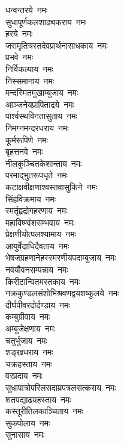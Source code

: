 \begin{multicols}{2}
\begin{flushleft}
धन्वन्तरये~नमः\\
सुधापूर्णकलशाढ्यकराय~नमः\\
हरये~नमः\\
जरामृतित्रस्तदेवप्रार्थना\-साधकाय~नमः\\
प्रभवे~नमः\\
निर्विकल्पाय~नमः\\
निस्समानाय~नमः\\
मन्दस्मितमुखाम्बुजाय~नमः\\
आञ्जनेयप्रापिताद्रये~नमः\\
पार्श्वस्थविनतासुताय~नमः\hfill{}\\
निमग्नमन्दरधराय~नमः\\
कूर्मरूपिणे~नमः\\
बृहत्तनवे~नमः\\
नीलकुञ्चितकेशान्ताय~नमः\\
परमाद्भुतरूपधृते~नमः\\
कटाक्षवीक्षणाश्वस्त\-वासुकिने~नमः\\
सिंहविक्रमाय~नमः\\
स्मर्तृहृद्रोगहरणाय~नमः\\
महाविष्ण्वंशसम्भवाय~नमः\\
प्रेक्षणीयोत्पलश्यामाय~नमः\hfill{}\\
आयुर्वेदाधिदैवताय~नमः\\
भेषजग्रहणानेहस्स्मरणीय\-पदाम्बुजाय~नमः\\
नवयौवनसम्पन्नाय~नमः\\
किरीटान्वितमस्तकाय~नमः\\
नक्रकुण्डलसंशोभि\-श्रवणद्वयशष्कुलये~नमः\\
दीर्घपीवरदोर्दण्डाय~नमः\\
कम्बुग्रीवाय~नमः\\
अम्बुजेक्षणाय~नमः\\
चतुर्भुजाय~नमः\\
शङ्खधराय~नमः\hfill{}\\
चक्रहस्ताय~नमः\\
वरप्रदाय~नमः\\
सुधापात्रोपरिलसदाम्रपत्र\-लसत्कराय~नमः\\
शतपद्याढ्यहस्ताय~नमः\\
कस्तूरीतिलकाञ्चिताय~नमः\\
सुकपोलाय~नमः\\
सुनासाय~नमः\\

\end{flushleft}
\end{multicols}
